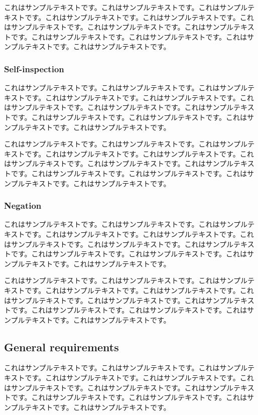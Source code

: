 \documentclass[a4paper, dvipdfmx]{jsarticle}
\begin{document}
これはサンプルテキストです。これはサンプルテキストです。これはサンプルテキストです。これはサンプルテキストです。これはサンプルテキストです。これはサンプルテキストです。これはサンプルテキストです。これはサンプルテキストです。これはサンプルテキストです。これはサンプルテキストです。これはサンプルテキストです。これはサンプルテキストです。

\subsubsection{Self-inspection}
これはサンプルテキストです。これはサンプルテキストです。これはサンプルテキストです。これはサンプルテキストです。これはサンプルテキストです。これはサンプルテキストです。これはサンプルテキストです。これはサンプルテキストです。これはサンプルテキストです。これはサンプルテキストです。これはサンプルテキストです。これはサンプルテキストです。

これはサンプルテキストです。これはサンプルテキストです。これはサンプルテキストです。これはサンプルテキストです。これはサンプルテキストです。これはサンプルテキストです。これはサンプルテキストです。これはサンプルテキストです。これはサンプルテキストです。これはサンプルテキストです。これはサンプルテキストです。これはサンプルテキストです。

\subsubsection{Negation}
これはサンプルテキストです。これはサンプルテキストです。これはサンプルテキストです。これはサンプルテキストです。これはサンプルテキストです。これはサンプルテキストです。これはサンプルテキストです。これはサンプルテキストです。これはサンプルテキストです。これはサンプルテキストです。これはサンプルテキストです。これはサンプルテキストです。

これはサンプルテキストです。これはサンプルテキストです。これはサンプルテキストです。これはサンプルテキストです。これはサンプルテキストです。これはサンプルテキストです。これはサンプルテキストです。これはサンプルテキストです。これはサンプルテキストです。これはサンプルテキストです。これはサンプルテキストです。これはサンプルテキストです。

\subsection{General requirements}
これはサンプルテキストです。これはサンプルテキストです。これはサンプルテキストです。これはサンプルテキストです。これはサンプルテキストです。これはサンプルテキストです。これはサンプルテキストです。これはサンプルテキストです。これはサンプルテキストです。これはサンプルテキストです。これはサンプルテキストです。これはサンプルテキストです。
\end{document}
